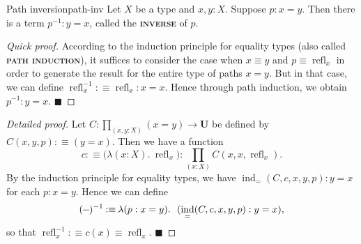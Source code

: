 \documentclass{article}
\newcommand{\defn}[1]{{\scshape\bfseries\color{MPBemph}#1}}
\renewcommand{\qed}{\hfill{\color{MPBthm}\( \blacksquare \)}}
\newcommand{\eql}{\mathbin{:\equiv}}
\newcommand{\U}{\mathbf{U}}
\newcommand{\tpi}[1]{\prod_{(#1)}}
\DeclareMathOperator{\ind}{ind}
\newcommand{\1}{\textbf{1}}
\newcommand{\0}{\mathbf{0}}
\newcommand{\2}{\textbf{2}}
\DeclareMathOperator{\refl}{refl}
\newcommand{\dash}{\rule[0.5ex]{1.5ex}{0.4pt}}
\begin{document}
\begin{thm}{Path inversion}{path-inv} Let \( X \) be a type and \( x, y : X \). Suppose \( p : x = y \). Then there is a term \( p^{-1} : y = x \), called the \defn{inverse} of \( p \).
\begin{proof}[Quick proof]
	According to the induction principle for equality types (also called \defn{path induction}), it suffices to consider the case when \( x \equiv y \) and \( p \equiv \refl_{x} \) in order to generate the result for the entire type of paths \( x = y \). But in that case, we can define \( {\refl_{x}^{-1}} \eql \refl_{x} : x = x \). Hence through path induction, we obtain \( p^{-1} : y = x \). \qed
\end{proof}
\begin{proof}[Detailed proof]
	Let \( C : \tpi{x, y : X} (x = y) \to \U \) be defined by \( C(x, y, p) \eql (y = x) \). Then we have a function
	\[ c \eql \big(\lambda(x : X).~{\refl_{x}}\big) : \tpi{x : X} C(x, x, \refl_{x}). \]
	By the induction principle for equality types, we have \( \ind_{=}(C, c, x, y, p) : y = x \) for each \( p : x = y \). Hence we can define
	\[ (\dash)^{-1} \eql \lambda(p : x = y).~~(\ind_{=}(C, c, x, y, p) : y = x), \]
	so that \( {\refl_{x}^{-1}} \eql c(x) \equiv \refl_{x} \). \qed
\end{proof} \end{thm}
\end{document}
